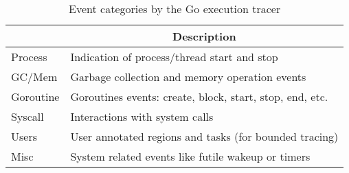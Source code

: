 \begin{table}[b]
    \centering
        \begin{tabular}{|l|l|}
        \hline
        \rowcolor[HTML]{C0C0C0}
        \multicolumn{1}{|c|}{\cellcolor[HTML]{C0C0C0}\textbf{Category}} & \multicolumn{1}{c|}{\cellcolor[HTML]{C0C0C0}\textbf{Description}} \\ \hline
        Process & Indication of process/thread start and stop \\ \hline
        GC/Mem & Garbage collection and memory operation events\\ \hline
        Goroutine & Goroutines events: create, block, start, stop, end, etc. \\ \hline
        Syscall & Interactions with system calls \\ \hline
        Users & User annotated regions and tasks (for bounded tracing) \\ \hline
        Misc & System related events like futile wakeup or timers \\ \hline
        \end{tabular}

    \caption{Event categories by the Go execution tracer}
    \label{tab:events}
\end{table}
